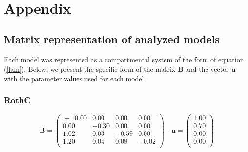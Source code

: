 \documentclass[draft,linenumbers]{agujournal}
\begin{document}
\clearpage

\section*{Appendix}
\subsection*{Matrix representation of analyzed models}
Each model was represented as a compartmental system of the form of equation (\ref{lam}). Below, we present the specific form of the matrix $\mathbf{B}$ and the vector ${\bm u}$  with the parameter values used for each model. 

\subsubsection*{RothC}
\begin{equation}
\mathbf{B} =
\begin{pmatrix}{}
  -10.00 & 0.00 & 0.00 & 0.00 \\ 
  0.00 & -0.30 & 0.00 & 0.00 \\ 
  1.02 & 0.03 & -0.59 & 0.00 \\ 
  1.20 & 0.04 & 0.08 & -0.02 \\ 
  \end{pmatrix}
\quad {\bm u} =
\begin{pmatrix}{}
  1.00 \\ 
  0.70 \\ 
  0.00 \\ 
  0.00 \\ 
  \end{pmatrix}
\end{equation}
\end{document}
